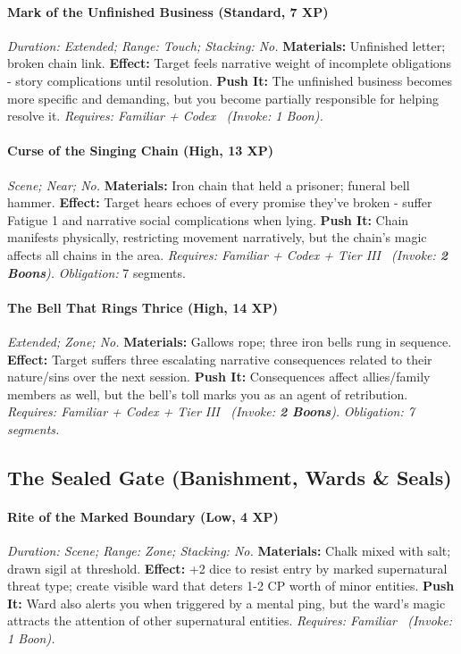 \documentclass[12pt,twoside]{book}
\begin{document}
\paragraph{Mark of the Unfinished Business (Standard, 7 XP)} \emph{Duration: Extended; Range: Touch; Stacking: No.}
\textbf{Materials:} Unfinished letter; broken chain link.
\textbf{Effect:} Target feels narrative weight of incomplete obligations - story complications until resolution.
\textbf{Push It:} The unfinished business becomes more specific and demanding, but you become partially responsible for helping resolve it.
\emph{Requires: Familiar + Codex \ (\textit{Invoke:} 1 Boon).}
\paragraph{Curse of the Singing Chain (High, 13 XP)} \emph{Scene; Near; No.}
\textbf{Materials:} Iron chain that held a prisoner; funeral bell hammer.
\textbf{Effect:} Target hears echoes of every promise they've broken - suffer Fatigue 1 and narrative social complications when lying.
\textbf{Push It:} Chain manifests physically, restricting movement narratively, but the chain's magic affects all chains in the area.
\emph{Requires: Familiar + Codex + Tier III \ (\textit{Invoke:} \textbf{2 Boons}).}
\emph{Obligation:} 7 segments.

\paragraph{The Bell That Rings Thrice (High, 14 XP)} \emph{Extended; Zone; No.}
\textbf{Materials:} Gallows rope; three iron bells rung in sequence.
\textbf{Effect:} Target suffers three escalating narrative consequences related to their nature/sins over the next session.
\textbf{Push It:} Consequences affect allies/family members as well, but the bell's toll marks you as an agent of retribution.
\emph{Requires: Familiar + Codex + Tier III \ (\textit{Invoke:} \textbf{2 Boons}).}
\emph{Obligation: 7 segments.}

\subsection{The Sealed Gate (Banishment, Wards \& Seals)}
\paragraph{Rite of the Marked Boundary (Low, 4 XP)} \emph{Duration: Scene; Range: Zone; Stacking: No.}
\textbf{Materials:} Chalk mixed with salt; drawn sigil at threshold.
\textbf{Effect:} +2 dice to resist entry by marked supernatural threat type; create visible ward that deters 1-2 CP worth of minor entities.
\textbf{Push It:} Ward also alerts you when triggered by a mental ping, but the ward's magic attracts the attention of other supernatural entities.
\emph{Requires: Familiar \ (\textit{Invoke:} 1 Boon).}
\end{document}
